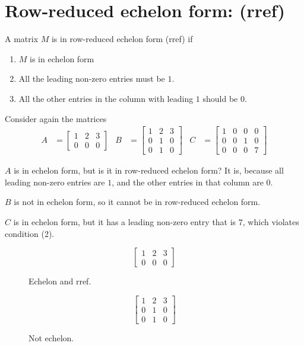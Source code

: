 \documentclass[11pt]{article}
\begin{document}
\section*{Row-reduced echelon form: (rref)}

\begin{minipage}[t]{.95\textwidth}
A matrix $M$ is in row-reduced echelon form (rref) if
\begin{enumerate}
\item{
$M$ is in echelon form
}
\item{
All the leading non-zero entries must be $1$.
}
\item{
All the other entries in the column with leading $1$ should be $0$.
}
\end{enumerate}
\end{minipage}


Consider again the matrices
\begin{align*}
A &= \begin{bmatrix}
1 & 2 & 3
\\
0 & 0 & 0
\end{bmatrix}
&
B &= \begin{bmatrix}
1 & 2 & 3
\\
0 & 1 & 0
\\
0 & 1 & 0
\end{bmatrix}
&
C &= \begin{bmatrix}
1 & 0 & 0 & 0
\\
0 & 0 & 1 & 0
\\
0 & 0 & 0 & 7
\end{bmatrix}
\end{align*}

$A$ is in echelon form, but is it in row-reduced echelon form? It is, because all leading non-zero entries are $1$, and the other entries in that column are $0$.

$B$ is not in echelon form, so it cannot be in row-reduced echelon form.

$C$ is in echelon form, but it has a leading non-zero entry that is $7$, which violates condition (2).

\begin{figure}
\centering
$$\begin{bmatrix}
1 & 2 & 3
\\
0 & 0 & 0
\end{bmatrix}$$
\caption{Echelon and rref.}
\end{figure}

\begin{figure}
\centering
$$\begin{bmatrix}
1 & 2 & 3
\\
0 & 1 & 0
\\
0 & 1 & 0
\end{bmatrix}$$
\caption{Not echelon.}
\end{figure}
\end{document}
